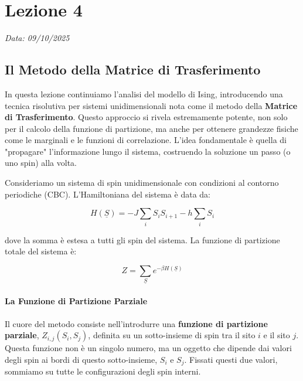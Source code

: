\chapter{Lezione 4}
\label{chap:lezione_04} 

\begin{flushright}
\textit{Data: 09/10/2025}
\end{flushright}


\section{Il Metodo della Matrice di Trasferimento}

In questa lezione continuiamo l'analisi del modello di Ising, introducendo una tecnica risolutiva per sistemi unidimensionali nota come il metodo della \textbf{Matrice di Trasferimento}. Questo approccio si rivela estremamente potente, non solo per il calcolo della funzione di partizione, ma anche per ottenere grandezze fisiche come le marginali e le funzioni di correlazione. L'idea fondamentale è quella di "propagare" l'informazione lungo il sistema, costruendo la soluzione un passo (o uno spin) alla volta.

Consideriamo un sistema di spin unidimensionale con condizioni al contorno periodiche (CBC). L'Hamiltoniana del sistema è data da:

\begin{equation}
H(\underline{S}) = -J \sum_{i} S_i S_{i+1} - h \sum_{i} S_i
\end{equation}

dove la somma è estesa a tutti gli spin del sistema. La funzione di partizione totale del sistema è:

\begin{equation}
Z = \sum_{\underline{S}} e^{-\beta H(\underline{S})}
\end{equation}

\subsubsection{La Funzione di Partizione Parziale}

Il cuore del metodo consiste nell'introdurre una \textbf{funzione di partizione parziale}, $Z_{i,j}(S_i, S_j)$, definita su un sotto-insieme di spin tra il sito $i$ e il sito $j$. Questa funzione non è un singolo numero, ma un oggetto che dipende dai valori degli spin ai bordi di questo sotto-insieme, $S_i$ e $S_j$. Fissati questi due valori, sommiamo su tutte le configurazioni degli spin interni.

